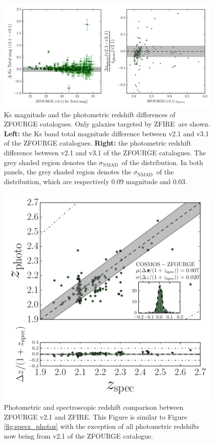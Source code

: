 \documentclass[iop]{emulateapj}
\newcommand{\NMAD}{$\sigma_{\mathrm{NMAD}}$}
\begin{document}
\begin{figure}
\includegraphics[trim = 10 10 10 5, clip, scale=0.925]{figures/cat_differences.pdf}
\caption{Ks magnitude and the photometric redshift differences of ZFOURGE catalogues.
Only galaxies targeted by ZFIRE\ are shown.
{\bf Left:} the Ks band total magnitude difference between v2.1 and v3.1 of the ZFOURGE catalogues. 
{\bf Right:} the photometric redshift difference between v2.1 and v3.1 of the ZFOURGE catalogues. The grey shaded region denotes the \NMAD\ of the distribution. 
In both panels, the grey shaded region denotes the \NMAD\ of the distribution, which are respectively 0.09 magnitude and 0.03. 
}
\label{fig:cat_differences}
\end{figure}



\begin{figure}
\includegraphics[trim = 10 10 10 5, clip, scale=0.65]{figures/specz_vs_photo_z_COSMOS_v2.1.pdf}
\caption{ Photometric and spectroscopic redshift comparison between ZFOURGE v2.1 and ZFIRE. 
This Figure is similar to Figure \ref{fig:specz_photoz} with the exception of all photometric redshifts now being from v2.1 of the ZFOURGE catalogue. 
}
\label{fig:specz_photoz_newcat}
\end{figure}
\end{document}
